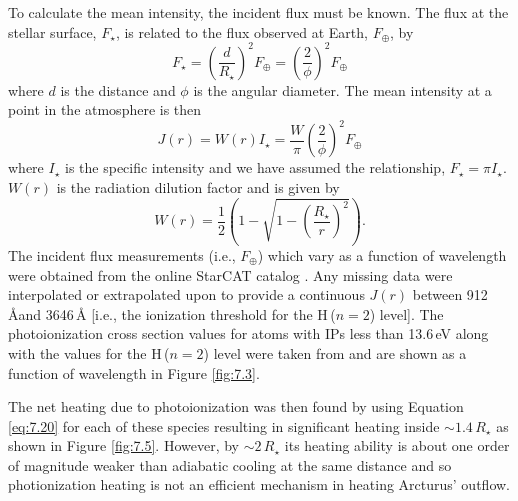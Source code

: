 To calculate the mean intensity, the incident flux must be known. The flux at the stellar surface, $F_{\star}$, is related to the flux observed at Earth, $F_{\oplus}$, by
\begin{equation}
F_{\star}= \left(\frac{d}{R_{\star}}\right)^2F_{\oplus}=\left(\frac{2}{\phi}\right)^2F_{\oplus}
\end{equation}
where $d$ is the distance and $\phi$ is the angular diameter. The mean intensity at a point in the atmosphere is then
\begin{equation}
J(r)=W(r)I_{\star} =\frac{W}{\pi}\left(\frac{2}{\phi}\right)^2F_{\oplus}
\end{equation}
where $I_{\star}$ is the specific intensity and we have assumed the relationship, $F_{\star}=\pi I_{\star}$. $W(r)$ is the radiation dilution factor and is given by
\begin{equation}
W(r)=\frac{1}{2}\left(1 - \sqrt{1-\left(\frac{R_{\star}}{r}\right)^2} \right).
\end{equation}
The incident flux measurements (i.e., $F_{\oplus}$) which vary as a function of wavelength were obtained from the online StarCAT catalog \citep{ayres_2010}. Any missing data were interpolated or extrapolated upon to provide a continuous $J(r)$ between 912\,\AA and 3646\,\AA\,\,[i.e., the ionization threshold for the H\,($n=2$) level]. The photoionization cross section values for atoms with IPs less than 13.6\,eV along with the values for the H\,($n=2$) level were taken from \cite{mathisen_1984} and are shown as a function of wavelength in Figure \ref{fig:7.3}. 

The net heating due to photoionization was then found by using Equation \ref{eq:7.20} for each of these species resulting in significant heating inside $\sim 1.4\,R_{\star}$ as shown in Figure \ref{fig:7.5}. However, by $\sim 2\,R_{\star}$ its heating ability is about one order of magnitude weaker than adiabatic cooling at the same distance and so photionization heating is not an efficient mechanism in heating Arcturus' outflow.

